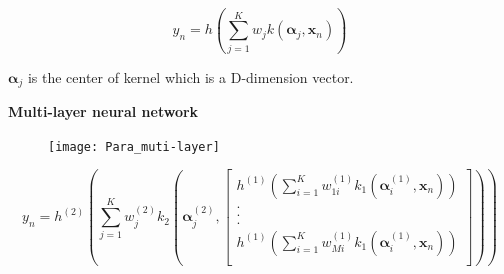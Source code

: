 \documentclass{article}
\begin{document}
\begin{equation}
y_n = h \left( \sum\limits_{j=1}^K w_j k( \bm{\alpha}_j, \mathbf{x}_{n}) \right)
\end{equation}
\par $\bm{\alpha}_j$ is the center of kernel which is a D-dimension vector.\\





\par \textbf{Multi-layer neural network}\\

\begin{figure}[h]
\centering
\texttt{[image: Para\_muti-layer]}
\end{figure}

\begin{equation}
y_n = h^{(2)} \left( \sum\limits_{j=1}^K w_j^{(2)} k_2( \bm{\alpha}_j^{(2)}, \left[ \begin{array}{c}
	h^{(1)} \left( \sum\limits_{i=1}^K w_{1i}^{(1)} k_1(\bm{\alpha}_i^{(1)},\mathbf{x}_n) \right)\\
	.\\
	.\\
	.\\
	h^{(1)} \left( \sum\limits_{i=1}^K w_{Mi}^{(1)} k_1(\bm{\alpha}_i^{(1)},\mathbf{x}_n) \right)\\
\end{array}
\right])
\right) 
\end{equation}







\end{document}
